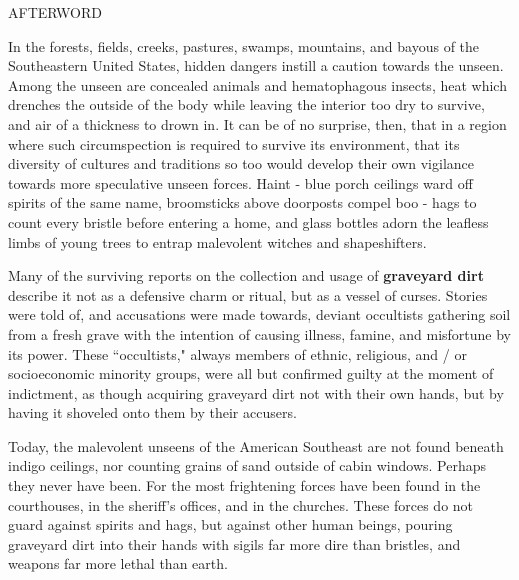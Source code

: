 \documentclass[12pt]{article}
\begin{document}
\vspace*{3\baselineskip}

\begin{center}
\huge AFTERWORD
\end{center}

\vspace*{2\baselineskip}

\begingroup
\hspace{10mm} In the forests, fields, creeks, pastures, swamps, mountains, and bayous of the Southeastern United States, hidden dangers instill a caution towards the unseen. Among the unseen are concealed animals and hematophagous insects, heat which drenches the outside of the body while leaving the interior too dry to survive, and air of a thickness to drown in. It can be of no surprise, then, that in a region where such circumspection is required to survive its environment, that its diversity of cultures and traditions so too would develop their own vigilance towards more speculative unseen forces. Haint - blue porch ceilings ward off spirits of the same name, broomsticks above doorposts compel boo - hags to count every bristle before entering a home, and glass bottles adorn the leafless limbs of young trees to entrap malevolent witches and shapeshifters. 
\endgroup

\begingroup
\hspace{10mm} Many of the surviving reports on the collection and usage of \textbf{graveyard dirt} describe it not as a defensive charm or ritual, but as a vessel of curses. Stories were told of, and accusations were made towards, deviant occultists gathering soil from a fresh grave with the intention of causing illness, famine, and misfortune by its power. These ``occultists," always members of ethnic, religious, and / or socioeconomic minority groups, were all but confirmed guilty at the moment of indictment, as though acquiring graveyard dirt not with their own hands, but by having it shoveled onto them by their accusers.
\endgroup

\begingroup
\hspace{10mm} Today, the malevolent unseens of the American Southeast are not found beneath indigo ceilings, nor counting grains of sand outside of cabin windows. Perhaps they never have been. For the most frightening forces have been found in the courthouses, in the sheriff's offices, and in the churches. These forces do not guard against spirits and hags, but against other human beings, pouring graveyard dirt into their hands with sigils far more dire than bristles, and weapons far more lethal than earth. 
\endgroup
\end{document}
